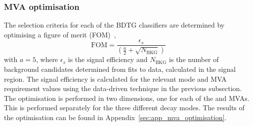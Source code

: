 \subsubsection{MVA optimisation}

The selection criteria for each of the BDTG classifiers are determined by optimising a figure of merit (FOM)~\cite{Punzi:2003bu}, 
\begin{equation}
\text{FOM}= \frac{\epsilon_{s}}{(\frac{a}{2} + \sqrt{N_{\text{BKG}}})}
\end{equation}
with $a=5$, where $\epsilon_{s}$ is the signal efficiency and $N_{\text{BKG}}$ is the number of background candidates determined from fits to data, calculated in the signal region. 
The signal efficiency is calculated for the relevant mode and MVA requirement values using the data-driven technique in the previous subsection. 
The optimisation is performed in two dimensions, one for each of the \phiz and \Dsp MVAs. This is performed separately for the three different \Dsp decay modes. The results of the optimisation can be found in Appendix~\ref{sec:app_mva_optimisation}. 

